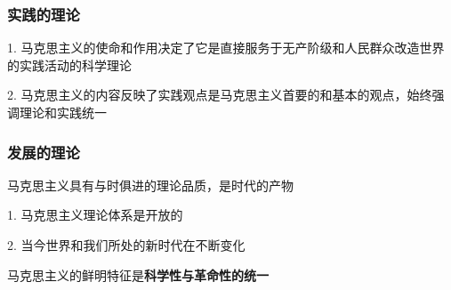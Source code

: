 \subsubsection{实践的理论}%
\label{subsub:实践的理论}
1. 马克思主义的使命和作用决定了它是直接服务于无产阶级和人民群众改造世界的实践活动的科学理论

2. 马克思主义的内容反映了实践观点是马克思主义首要的和基本的观点，始终强调理论和实践统一
\subsubsection{发展的理论}%
\label{subsub:发展的理论}
马克思主义具有与时俱进的理论品质，是时代的产物

1. 马克思主义理论体系是开放的

2. 当今世界和我们所处的新时代在不断变化
\begin{notation}
    马克思主义的鲜明特征是\textbf{科学性与革命性的统一}
\end{notation}

